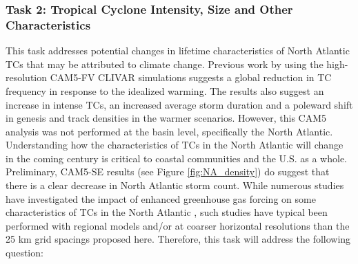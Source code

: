\documentclass[11pt]{article}
\begin{document}




\subsubsection{Task 2: Tropical Cyclone Intensity, Size and Other Characteristics}

This task addresses potential changes in lifetime characteristics of North Atlantic TCs that may be attributed to climate change. Previous work by \citet{Wehner2015} using the high-resolution CAM5-FV CLIVAR simulations suggests a global reduction in TC frequency in response to the idealized warming. The results also suggest an increase in intense TCs, an increased average storm duration and a poleward shift in genesis and track densities in the warmer scenarios. However, this CAM5 analysis was not performed at the basin level, specifically the North Atlantic. Understanding how the characteristics of TCs in the North Atlantic will change in the coming century is critical to coastal communities and the U.S. as a whole. Preliminary, CAM5-SE results (see Figure \ref{fig:NA_density}) do suggest that there is a clear decrease in North Atlantic storm count. While numerous studies have investigated the impact of enhanced greenhouse gas forcing on some characteristics of TCs in the North Atlantic \citep[e.g.,][]{Semmler2008,Knutson2008,Zhao2009,Knutson2013,Done2013,Diro2014}, such studies have typical been performed with regional models and/or at coarser horizontal resolutions than the 25 km grid spacings proposed here.  Therefore, this task will address the following question:
\end{document}
